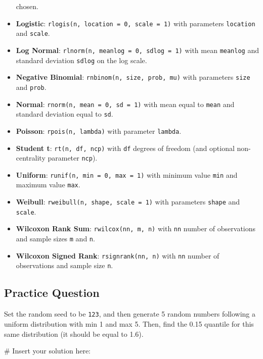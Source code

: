 \documentclass[
  letterpaper,
]{latex/krantz}
\makeatletter
\newenvironment{Shaded}{\begin{snugshade}}{\end{snugshade}}
\newcommand{\CommentTok}[1]{\textcolor[rgb]{0.37,0.37,0.37}{#1}}
\newenvironment{kframe}{%
\medskip{}
\setlength{\fboxsep}{.8em}
 \def\at@end@of@kframe{}%
 \ifinner\ifhmode%
  \def\at@end@of@kframe{\end{minipage}}%
  \begin{minipage}{\columnwidth}%
 \fi\fi%
 \def\FrameCommand##1{\hskip\@totalleftmargin \hskip-\fboxsep
 \colorbox{shadecolor}{##1}\hskip-\fboxsep
     \hskip-\linewidth \hskip-\@totalleftmargin \hskip\columnwidth}%
 \MakeFramed {\advance\hsize-\width
   \@totalleftmargin\z@ \linewidth\hsize
   \@setminipage}}%
 {\par\unskip\endMakeFramed%
 \at@end@of@kframe}
\renewenvironment{Shaded}{\begin{kframe}}{\end{kframe}}
\makeatother
\begin{document}
\begin{itemize}
  chosen.
\item
  \textbf{Logistic}: \texttt{rlogis(n,\ location\ =\ 0,\ scale\ =\ 1)}
  with parameters \texttt{location} and \texttt{scale}.
\item
  \textbf{Log Normal}: \texttt{rlnorm(n,\ meanlog\ =\ 0,\ sdlog\ =\ 1)}
  with mean \texttt{meanlog} and standard deviation \texttt{sdlog} on
  the log scale.
\item
  \textbf{Negative Binomial}: \texttt{rnbinom(n,\ size,\ prob,\ mu)}
  with parameters \texttt{size} and \texttt{prob}.
\item
  \textbf{Normal}: \texttt{rnorm(n,\ mean\ =\ 0,\ sd\ =\ 1)} with mean
  equal to \texttt{mean} and standard deviation equal to \texttt{sd}.
\item
  \textbf{Poisson}: \texttt{rpois(n,\ lambda)} with parameter
  \texttt{lambda}.
\item
  \textbf{Student t}: \texttt{rt(n,\ df,\ ncp)} with \texttt{df} degrees
  of freedom (and optional non-centrality parameter \texttt{ncp}).
\item
  \textbf{Uniform}: \texttt{runif(n,\ min\ =\ 0,\ max\ =\ 1)} with
  minimum value \texttt{min} and maximum value \texttt{max}.
\item
  \textbf{Weibull}: \texttt{rweibull(n,\ shape,\ scale\ =\ 1)} with
  parameters \texttt{shape} and \texttt{scale}.
\item
  \textbf{Wilcoxon Rank Sum}: \texttt{rwilcox(nn,\ m,\ n)} with
  \texttt{nn} number of observations and sample sizes \texttt{m} and
  \texttt{n}.
\item
  \textbf{Wilcoxon Signed Rank}: \texttt{rsignrank(nn,\ n)} with
  \texttt{nn} number of observations and sample size \texttt{n}.
\end{itemize}

\subsection{Practice Question}\label{practice-question-15}

Set the random seed to be \texttt{123}, and then generate 5 random
numbers following a uniform distribution with min 1 and max 5. Then,
find the 0.15 quantile for this same distribution (it should be equal to
1.6).

\begin{Shaded}
\begin{Highlighting}[]
\CommentTok{\# Insert your solution here:}
\end{Highlighting}
\end{Shaded}
\end{document}
